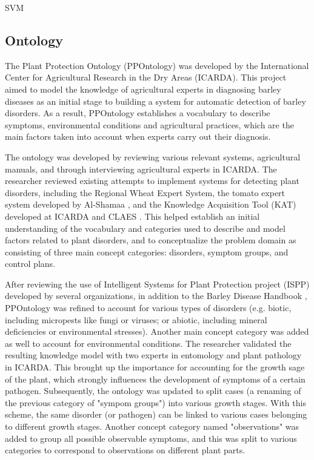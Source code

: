 \documentclass{frontiersSCNS} %
\newcommand{\todo}[1]{
  \rule{0pt}{0pt}\marginpar{{\color{blue}\rule{1ex}{1ex}}}
  {[\textbf{\color{blue}todo:} #1]}}
\begin{document}
SVM


\subsection{Ontology}
The Plant Protection Ontology (PPOntology) was developed by the International Center for Agricultural Research in the Dry Areas (ICARDA). This project aimed to model the knowledge of agricultural experts in diagnosing barley diseases as an initial stage to building a system for automatic detection of barley disorders. As a result, PPOntology establishes a vocabulary to describe symptoms, environmental conditions and agricultural practices, which are the main factors taken into account when experts carry out their diagnosis.

The ontology was developed by reviewing various relevant systems, agricultural manuals, and through interviewing agricultural experts in ICARDA. The researcher reviewed existing attempts to implement systems for detecting plant disorders, including the Regional Wheat Expert System, the tomato expert system developed by Al-Shamaa \cite{}, and the Knowledge Acquisition Tool (KAT) \cite{boose1990knowledge} developed at ICARDA and
CLAES \cite{el2002expert}. This helped establish an initial understanding of the vocabulary and categories used to describe and model factors related to plant disorders, and to conceptualize the problem domain as consisting of three main concept categories: disorders, symptom groups, and control plans.

After reviewing the use of Intelligent Systems for Plant Protection project (ISPP) developed by several organizations, in addition to the Barley Disease Handbook \cite{neate2010barley}, PPOntology was refined to account for various types of disorders (e.g. biotic, including micropests like fungi or viruses; or abiotic, including mineral deficiencies or environmental stresses). Another main concept category was added as well to account for environmental conditions. The researcher validated the resulting knowledge model with two experts in entomology and plant pathology in ICARDA. This brought up the importance for accounting for the growth sage of the plant, which strongly influences the development of symptoms of a certain pathogen. Subsequently, the ontology was updated to split cases (a renaming of the previous category of "sympom groups") into various growth stages. With this scheme, the same disorder (or pathogen) can be linked to various cases belonging to different growth stages. Another concept category named "observations" was added to group all possible observable symptoms, and this was split to various categories to correspond to observations on different plant parts.
\end{document}
